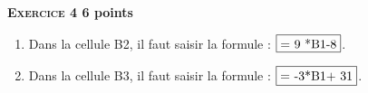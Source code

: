 \textbf{\textsc{Exercice 4} \hfill 6 points}

\medskip

%
%
%
%

	\begin{enumerate}
		\item %
Dans la cellule B2, il faut saisir la formule : $\fbox{= 9 *\text{}B1-8}$.
		\item %
Dans la cellule B3, il faut saisir la formule :
$\fbox{= -3*\text{B}1+ 31}$.
	\end{enumerate}
\item %
	

